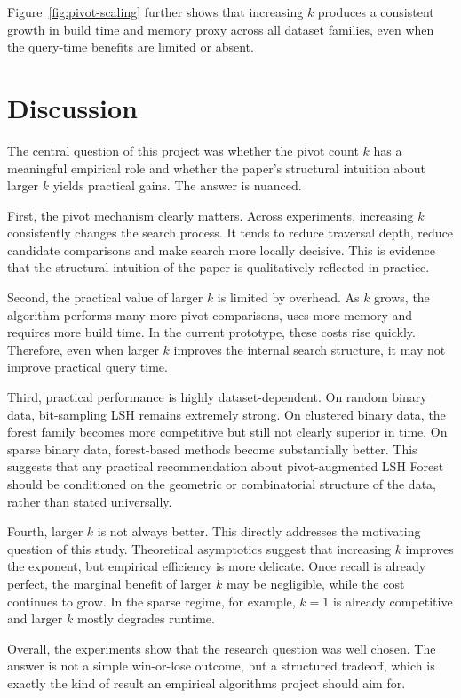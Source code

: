 \documentclass[11pt]{article}
\begin{document}
Figure~\ref{fig:pivot-scaling} further shows that increasing $k$ produces a consistent growth in build time and memory proxy across all dataset families, even when the query-time benefits are limited or absent.

\section{Discussion}

The central question of this project was whether the pivot count $k$ has a meaningful empirical role and whether the paper's structural intuition about larger $k$ yields practical gains. The answer is nuanced.

First, the pivot mechanism clearly matters. Across experiments, increasing $k$ consistently changes the search process. It tends to reduce traversal depth, reduce candidate comparisons and make search more locally decisive. This is evidence that the structural intuition of the paper is qualitatively reflected in practice.

Second, the practical value of larger $k$ is limited by overhead. As $k$ grows, the algorithm performs many more pivot comparisons, uses more memory and requires more build time. In the current prototype, these costs rise quickly. Therefore, even when larger $k$ improves the internal search structure, it may not improve practical query time.

Third, practical performance is highly dataset-dependent. On random binary data, bit-sampling LSH remains extremely strong. On clustered binary data, the forest family becomes more competitive but still not clearly superior in time. On sparse binary data, forest-based methods become substantially better. This suggests that any practical recommendation about pivot-augmented LSH Forest should be conditioned on the geometric or combinatorial structure of the data, rather than stated universally.

Fourth, larger $k$ is not always better. This directly addresses the motivating question of this study. Theoretical asymptotics suggest that increasing $k$ improves the exponent, but empirical efficiency is more delicate. Once recall is already perfect, the marginal benefit of larger $k$ may be negligible, while the cost continues to grow. In the sparse regime, for example, $k=1$ is already competitive and larger $k$ mostly degrades runtime.

Overall, the experiments show that the research question was well chosen. The answer is not a simple win-or-lose outcome, but a structured tradeoff, which is exactly the kind of result an empirical algorithms project should aim for.
\end{document}
